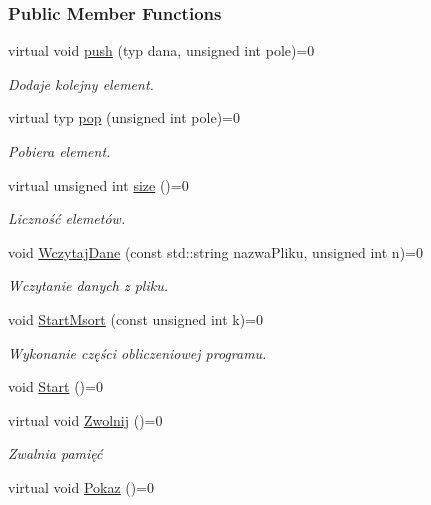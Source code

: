 \subsubsection*{Public Member Functions}
\begin{DoxyCompactItemize}
\item 
virtual void \hyperlink{class_interfejs_a_d_t_abae6ef55c501edc4ca4e0faf4436b0df}{push} (typ dana, unsigned int pole)=0
\begin{DoxyCompactList}\small\item\em Dodaje kolejny element. \end{DoxyCompactList}\item 
virtual typ \hyperlink{class_interfejs_a_d_t_aa5a81a01c32577d986320524bcd091f0}{pop} (unsigned int pole)=0
\begin{DoxyCompactList}\small\item\em Pobiera element. \end{DoxyCompactList}\item 
virtual unsigned int \hyperlink{class_interfejs_a_d_t_a871cc26c895ce229ad04f7897fe4ba48}{size} ()=0
\begin{DoxyCompactList}\small\item\em Liczność elemetów. \end{DoxyCompactList}\item 
void \hyperlink{class_interfejs_a_d_t_ae37b5d3abf3a7a85adf02e42e09df875}{Wczytaj\-Dane} (const std\-::string nazwa\-Pliku, unsigned int n)=0
\begin{DoxyCompactList}\small\item\em Wczytanie danych z pliku. \end{DoxyCompactList}\item 
void \hyperlink{class_interfejs_a_d_t_a7fc6b6c9b0606a24846b7e744ee8a823}{Start\-Msort} (const unsigned int k)=0
\begin{DoxyCompactList}\small\item\em Wykonanie części obliczeniowej programu. \end{DoxyCompactList}\item 
void \hyperlink{class_interfejs_a_d_t_ae4f4f725bf09c5b258bc0d12e0f589d8}{Start} ()=0
\item 
virtual void \hyperlink{class_interfejs_a_d_t_a75427479b00e3d4a0c5f9615216262ea}{Zwolnij} ()=0
\begin{DoxyCompactList}\small\item\em Zwalnia pamięć \end{DoxyCompactList}\item 
virtual void \hyperlink{class_interfejs_a_d_t_a22e091ad4cdcade33f9fa579a90ebf79}{Pokaz} ()=0
\end{DoxyCompactItemize}



